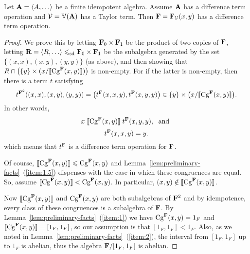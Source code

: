 \begin{theorem}
\label{thm:main-result}
Let $\bA = \<A, \dots\>$ be a finite idempotent algebra.
Assume $\mathbf{A}$ has a difference term operation and 
$\mathcal{V} = \operatorname{\mathbb{V}}(\mathbf{A})$ has a Taylor term.
Then $\mathbf{F} = \mathbf{F}_{\mathcal{V}}(x,y)$ has a difference term operation.
\end{theorem}
\begin{proof}
  
We prove this by 
letting $\mathbf{F}_0 \times \mathbf{F}_1$ be the product of two copies of $\mathbf{F}$,
letting $\bR = \<R, \dots\>  \sdp \bF_0 \times \bF_1$ be the subalgebra generated
by the set $\{(x, x), (x, y), (y, y)\}$ (as above), and then showing that
$R \cap \bigl(\{y\} \times (x/\llbracket \operatorname{Cg}^{\mathbf{F}}(x,y) \rrbracket)\bigr)$ is non-empty.  For if the latter is
non-empty, then there is a term $t$ satisfying
\[
t^{\mathbf{F}^2}((x,x),(x,y),(y,y)) =\bigl(t^{\mathbf{F}}(x,x,y), t^{\mathbf{F}}(x,y,y)\bigr) \in
\{y\} \times \bigl(x/\llbracket \operatorname{Cg}^{\mathbf{F}}(x,y) \rrbracket\bigr).
\]
In other words,
\begin{equation}
  \label{dt2-rel}
  x \mathrel{\llbracket \operatorname{Cg}^{\mathbf{F}}(x,y) \rrbracket} t^{\mathbf{F}}(x,y,y), \;  \text{ and }
\end{equation}
\begin{equation}
  \label{dt2-id}
t^{\mathbf{F}}(x,x,y) = y.
\end{equation}
which means that $t^{\mathbf{F}}$ is a difference term operation for $\mathbf{F}$.

Of course, $\llbracket \operatorname{Cg}^{\mathbf{F}}(x,y) \rrbracket \leqslant \operatorname{Cg}^{\mathbf{F}}(x,y)$ and
Lemma~\ref{lem:preliminary-facts}~(\ref{item:1.5}) dispenses with
the case in which these congruences are equal.
So, %
assume
$\llbracket \operatorname{Cg}^{\mathbf{F}}(x,y) \rrbracket < \operatorname{Cg}^{\mathbf{F}}(x,y)$. In particular,
$(x,y) \notin \llbracket \operatorname{Cg}^{\mathbf{F}}(x,y) \rrbracket$.

Now $\llbracket \operatorname{Cg}^{\mathbf{F}}(x,y) \rrbracket$ and $\operatorname{Cg}^{\mathbf{F}}(x,y)$ are both subalgebras of $\mathbf{F}^2$
and by idempotence, every class of these congruences is a subalgebra of $\mathbf{F}$.
By Lemma~\ref{lem:preliminary-facts}~(\ref{item:1}) we have 
$\operatorname{Cg}^{\mathbf{F}}(x,y) = 1_F$ and $\llbracket \operatorname{Cg}^{\mathbf{F}}(x,y) \rrbracket = [1_F,1_F]$, so our assumption
is that $[1_F,1_F]< 1_F$.  Also, as we noted in
Lemma~\ref{lem:preliminary-facts}~(\ref{item:2}), the interval from 
$[1_F, 1_F]$ up to $1_F$ is abelian, thus the
algebra $\mathbf{F}/[1_F, 1_F]$ is abelian.


\end{proof}
